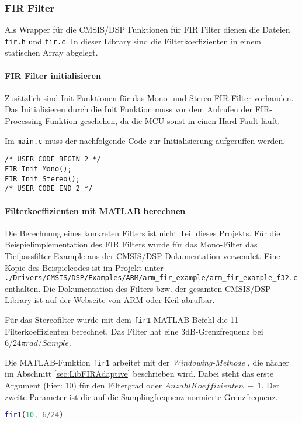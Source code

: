 \subsubsection{FIR Filter}
\label{sec:LibFIRFilter}

Als Wrapper für die CMSIS/DSP Funktionen für FIR Filter dienen die Dateien \texttt{fir.h} und \texttt{fir.c}. In dieser Library sind die Filterkoeffizienten in einem statischen Array abgelegt.


\paragraph{FIR Filter initialisieren}

Zusätzlich sind Init-Funktionen für das Mono- und Stereo-FIR Filter vorhanden. 
Das Initialisieren durch die Init Funktion muss vor dem Aufrufen der FIR-Processing Funktion geschehen, da die MCU sonst in einen Hard Fault läuft.

Im \texttt{main.c} muss der nachfolgende Code zur Initialisierung aufgeruffen werden.

\begin{lstlisting}[style=Cuvision, caption={Init Funktion der FIR Filter}]
/* USER CODE BEGIN 2 */
FIR_Init_Mono();
FIR_Init_Stereo();
/* USER CODE END 2 */
\end{lstlisting}


\paragraph{Filterkoeffizienten mit MATLAB berechnen}

Die Berechnung eines konkreten Filters ist nicht Teil dieses Projekts.
Für die Beispielimplementation des FIR Filters wurde für das Mono-Filter das Tiefpassfilter Example aus der CMSIS/DSP Dokumentation verwendet. 
Eine Kopie des Beispielcodes ist im Projekt unter \texttt{./Drivers/CMSIS/DSP/Examples/ARM/arm\_fir\_example/arm\_fir\_example\_f32.c} enthalten.
Die Dokumentation des Filters bzw. der gesamten CMSIS/DSP Library ist auf der Webseite von ARM \cite{cmsis-doc-arm} oder Keil \cite{cmsis-doc-keil} abrufbar.

Für das Stereofilter wurde mit dem \texttt{fir1} MATLAB-Befehl die 11 Filterkoeffizienten berechnet. Das Filter hat eine 3dB-Grenzfrequenz bei $6/24 \pi rad/Sample$.

Die MATLAB-Funktion \texttt{fir1} arbeitet mit der \textit{Windowing-Methode} \cite{FIR-Windowing}, die nächer im Abschnitt \ref{sec:LibFIRAdaptive} beschrieben wird.
Dabei steht das erste Argument (hier: 10) für den Filtergrad oder $Anzahl Koeffizienten\ -\ 1$. Der zweite Parameter ist die auf die Samplingfrequenz normierte Grenzfrequenz.

\begin{lstlisting}[language=matlab]
fir1(10, 6/24)
\end{lstlisting}


